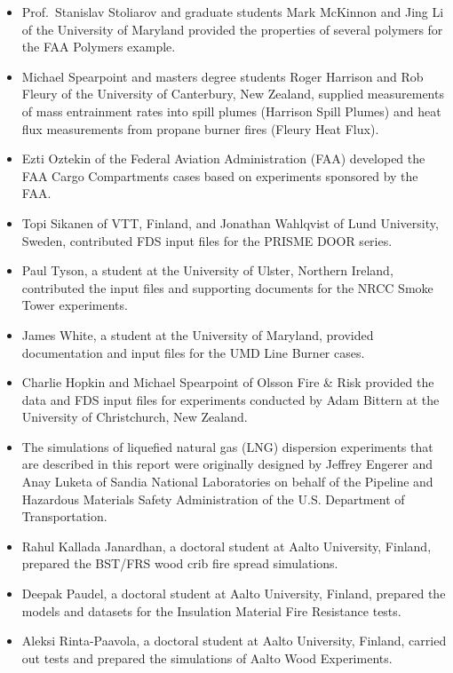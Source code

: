 \documentclass[11pt]{book}
\begin{document}
\begin{itemize}
\item Prof.~Stanislav Stoliarov and graduate students Mark McKinnon and Jing Li of the University of Maryland provided the properties of several polymers for the FAA Polymers example.
\item Michael Spearpoint and masters degree students Roger Harrison and Rob Fleury of the University of Canterbury, New Zealand, supplied measurements of mass entrainment rates into spill plumes (Harrison Spill Plumes) and heat flux measurements from propane burner fires (Fleury Heat Flux).
\item Ezti Oztekin of the Federal Aviation Administration (FAA) developed the FAA Cargo Compartments cases based on experiments sponsored by the FAA.
\item Topi Sikanen of VTT, Finland, and Jonathan Wahlqvist of Lund University, Sweden, contributed FDS input files for the PRISME DOOR series.
\item Paul Tyson, a student at the University of Ulster, Northern Ireland, contributed the input files and supporting documents for the NRCC Smoke Tower experiments.
\item James White, a student at the University of Maryland, provided documentation and input files for the UMD Line Burner cases.
\item Charlie Hopkin and Michael Spearpoint of Olsson Fire \& Risk provided the data and FDS input files for experiments conducted by Adam Bittern at the University of Christchurch, New Zealand.
\item The simulations of liquefied natural gas (LNG) dispersion experiments that are described in this report were originally designed by Jeffrey Engerer and Anay Luketa of Sandia National Laboratories on behalf of the Pipeline and Hazardous Materials Safety Administration of the U.S. Department of Transportation.
\item Rahul Kallada Janardhan, a doctoral student at Aalto University, Finland, prepared the BST/FRS wood crib fire spread simulations.
\item Deepak Paudel, a doctoral student at Aalto University, Finland, prepared the models and datasets for the Insulation Material Fire Resistance tests.
\item Aleksi Rinta-Paavola, a doctoral student at Aalto University, Finland, carried out tests and prepared the simulations of Aalto Wood Experiments.
\end{itemize}
\end{document}
